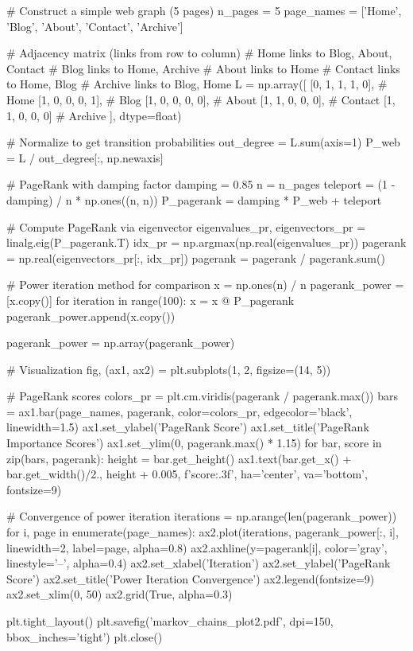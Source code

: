 \documentclass[11pt,a4paper]{article}
\begin{document}
\begin{pycode}
# Construct a simple web graph (5 pages)
n_pages = 5
page_names = ['Home', 'Blog', 'About', 'Contact', 'Archive']

# Adjacency matrix (links from row to column)
# Home links to Blog, About, Contact
# Blog links to Home, Archive
# About links to Home
# Contact links to Home, Blog
# Archive links to Blog, Home
L = np.array([
    [0, 1, 1, 1, 0],   # Home
    [1, 0, 0, 0, 1],   # Blog
    [1, 0, 0, 0, 0],   # About
    [1, 1, 0, 0, 0],   # Contact
    [1, 1, 0, 0, 0]    # Archive
], dtype=float)

# Normalize to get transition probabilities
out_degree = L.sum(axis=1)
P_web = L / out_degree[:, np.newaxis]

# PageRank with damping factor
damping = 0.85
n = n_pages
teleport = (1 - damping) / n * np.ones((n, n))
P_pagerank = damping * P_web + teleport

# Compute PageRank via eigenvector
eigenvalues_pr, eigenvectors_pr = linalg.eig(P_pagerank.T)
idx_pr = np.argmax(np.real(eigenvalues_pr))
pagerank = np.real(eigenvectors_pr[:, idx_pr])
pagerank = pagerank / pagerank.sum()

# Power iteration method for comparison
x = np.ones(n) / n
pagerank_power = [x.copy()]
for iteration in range(100):
    x = x @ P_pagerank
    pagerank_power.append(x.copy())

pagerank_power = np.array(pagerank_power)

# Visualization
fig, (ax1, ax2) = plt.subplots(1, 2, figsize=(14, 5))

# PageRank scores
colors_pr = plt.cm.viridis(pagerank / pagerank.max())
bars = ax1.bar(page_names, pagerank, color=colors_pr, edgecolor='black', linewidth=1.5)
ax1.set_ylabel('PageRank Score')
ax1.set_title('PageRank Importance Scores')
ax1.set_ylim(0, pagerank.max() * 1.15)
for bar, score in zip(bars, pagerank):
    height = bar.get_height()
    ax1.text(bar.get_x() + bar.get_width()/2., height + 0.005,
             f'{score:.3f}', ha='center', va='bottom', fontsize=9)

# Convergence of power iteration
iterations = np.arange(len(pagerank_power))
for i, page in enumerate(page_names):
    ax2.plot(iterations, pagerank_power[:, i], linewidth=2, label=page, alpha=0.8)
    ax2.axhline(y=pagerank[i], color='gray', linestyle='--', alpha=0.4)
ax2.set_xlabel('Iteration')
ax2.set_ylabel('PageRank Score')
ax2.set_title('Power Iteration Convergence')
ax2.legend(fontsize=9)
ax2.set_xlim(0, 50)
ax2.grid(True, alpha=0.3)

plt.tight_layout()
plt.savefig('markov_chains_plot2.pdf', dpi=150, bbox_inches='tight')
plt.close()
\end{pycode}
\end{document}
